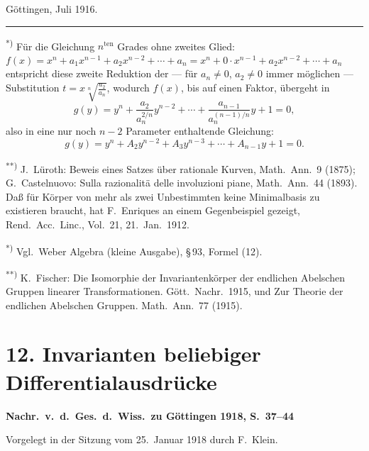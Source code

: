 \documentclass[12pt,a4paper]{article}
\begin{document}
\noindent G\"ottingen, Juli 1916.

\medskip
\noindent\rule{0.3\textwidth}{0.4pt}

\noindent\textsuperscript{*)} F\"ur die Gleichung $n^{\mathrm{ten}}$ Grades ohne zweites Glied:
$f(x)=x^{n}+a_{1}x^{n-1}+a_{2}x^{n-2}+\cdots+a_{n}=x^{n}+0\cdot x^{n-1}+a_{2}x^{n-2}+\cdots+a_{n}$
entspricht diese zweite Reduktion der --- f\"ur $a_{n}\neq 0$, $a_{2}\neq 0$ immer m\"oglichen --- Substitution $t=x\sqrt[n]{\frac{a_{2}}{a_{n}}}$, wodurch $f(x)$, bis auf einen Faktor, \"ubergeht in
\[
g(y)=y^{n}+\frac{a_{2}}{a_{n}^{2/n}}y^{n-2}+\cdots+\frac{a_{n-1}}{a_{n}^{(n-1)/n}}y+1=0,
\]
also in eine nur noch $n-2$ Parameter enthaltende Gleichung:
\[
g(y)=y^{n}+A_{2}y^{n-2}+A_{3}y^{n-3}+\cdots+A_{n-1}y+1=0.
\]

\smallskip
\noindent\textsuperscript{**)} J.\ L\"uroth: Beweis eines Satzes \"uber rationale Kurven, Math.\ Ann.\ 9 (1875); G.\ Castelnuovo: Sulla razionalit\"a delle involuzioni piane, Math.\ Ann.\ 44 (1893). Da\ss{} f\"ur K\"orper von mehr als zwei Unbestimmten keine Minimalbasis zu existieren braucht, hat F.\ Enriques an einem Gegenbeispiel gezeigt, Rend.\ Acc.\ Linc., Vol.\ 21, 21.\ Jan.\ 1912.

\smallskip
\noindent\textsuperscript{*)} Vgl.\ Weber Algebra (kleine Ausgabe), \S\,93, Formel (12).

\smallskip
\noindent\textsuperscript{**)} K.\ Fischer: Die Isomorphie der Invariantenk\"orper der endlichen Abelschen Gruppen linearer Transformationen. G\"ott.\ Nachr.\ 1915, und Zur Theorie der endlichen Abelschen Gruppen. Math.\ Ann.\ 77 (1915).

\newpage

\section*{12. Invarianten beliebiger Differentialausdr\"ucke}

\noindent\textbf{Nachr.\ v.\ d.\ Ges.\ d.\ Wiss.\ zu G\"ottingen 1918, S.\ 37--44}

\medskip
\noindent Vorgelegt in der Sitzung vom 25.\ Januar 1918 durch F.\ Klein.

\medskip
\end{document}

